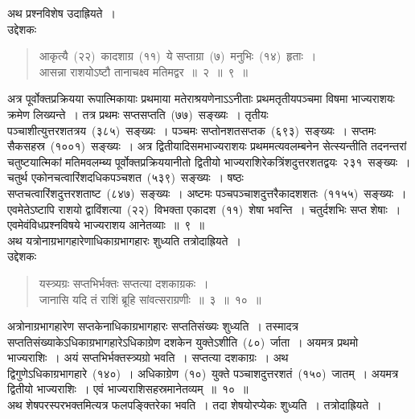 \documentclass[11pt, openany]{book}
\begin{document}
अथ प्रश्नविशेष उदाह्रियते~। \\

\noindent उद्देशकः\textendash
\begin{quote}
{\ku
आकृत्यै~(२२)~कादशाग्र~(११)~ये सप्ताग्रा~(७)~मनुभिः~(१४)~हृताः~।\\
आसन्ना राशयोऽष्टौ तानाचक्ष्व मतिमद्वर~॥~२~॥~९~॥}
\end{quote}

\indent
अत्र पूर्वोक्तप्रक्रियया रूपात्मिकायाः प्रथमाया मतेराश्रयणेनाऽऽनीताः प्रथमतृतीयपञ्चमा विषमा भाज्यराशयः क्रमेण लिख्यन्ते~। तत्र प्रथमः सप्तसप्तति~(७७)~सङ्ख्यः~। तृतीयः पञ्चाशीत्युत्तरशतत्रय~(३८५)~सङ्ख्यः~। पञ्चमः सप्तोनशतसप्तक~(६९३)~सङ्ख्यः~। सप्तमः सैकसहस्र~(१००१)~सङ्ख्यः~। अत्र द्वितीयादिसमभाज्यराशयः प्रथममत्यवलम्बनेन सेत्स्यन्तीति तदनन्तरां चतुष्टयात्मिकां मतिमवलम्ब्य पूर्वोक्तप्रक्रिययानीतो द्वितीयो भाज्यराशिरेकत्रिंशदुत्तरशतद्वयः~२३१~सङ्ख्यः~। चतुर्थ एकोनचत्वारिंशदधिकपञ्चशत~(५३९)~सङ्ख्यः~। षष्ठः सप्तचत्वारिंशदुत्तरशताष्ट~(८४७)~सङ्ख्यः~। अष्टमः पञ्चपञ्चाशदुत्तरैकादशशतः~(११५५)~सङ्ख्यः~। एवमेतेऽष्टापि
राशयो द्वाविंशत्या~(२२)~विभक्ता एकादश~(११)~शेषा भवन्ति~। चतुर्दशभिः सप्त शेषाः~। एवमेवंविधप्रश्नविषये भाज्यराशय आनेतव्याः~॥~९~॥\\

\indent
अथ यत्रोनाग्रभागहारेणाधिकाग्रभागहारः शुध्यति तत्रोदाह्रियते~।\\

\noindent उद्देशकः\textendash

\begin{quote}
{\ku
यस्त्र्यग्रः सप्तभिर्भक्तः सप्तत्या दशकाग्रकः~।\\
जानासि यदि तं राशिं ब्रूहि सांवत्सराग्रणीः~॥~३~॥~१०~॥}
\end{quote}

\newpage
\thispagestyle{fancy}
\fancyhf{}

\indent
अत्रोनाग्रभागहारेण सप्तकेनाधिकाग्रभागहारः सप्ततिसंख्यः शुध्यति~। तस्मादत्र सप्ततिसंख्याकेऽधिकाग्रभागहारेऽधिकाग्रेण दशकेन युक्तेऽशीति~(८०)~र्जाता~। अयमत्र प्रथमो भाज्यराशिः~। अयं सप्तभिर्भक्तस्त्र्यग्रो भवति~। सप्तत्या दशकाग्रः~। अथ द्विगुणेऽधिकाग्रभागहारे~(१४०)~। अधिकाग्रेण~(१०)~युक्ते पञ्चाशदुत्तरशतं~(१५०)~जातम्~। अयमत्र द्वितीयो भाज्यराशिः~। एवं भाज्यराशिसहस्रमानेतव्यम्~॥~१०~॥\\

अथ शेषपरस्परभक्तमित्यत्र फलपङ्क्तिरेका भवति~। तदा शेषयोरप्येकः शुध्यति~। तत्रोदाह्रियते~।\\
\end{document}
